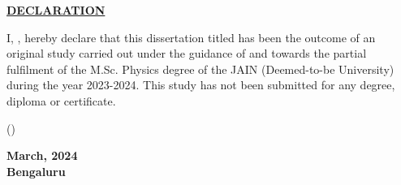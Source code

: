 \thispagestyle{empty}

\begin{center}
    \Large

    \underline{\textbf{DECLARATION}}\\

\end{center}

\vspace{1.5cm}

\noindent
I, \textbf{\auth{}}, hereby declare that this dissertation titled \textbf{\projectname} has been the outcome of an original study carried out under the guidance of \textbf{\gnameOne} and \textbf{\gnameTwo} towards
the partial fulfilment of the M.Sc. Physics degree of the JAIN (Deemed-to-be University)
during the year 2023-2024. This study has not been submitted for any degree, diploma or
certificate.

\vspace{5cm}

\noindent
\begin{minipage}{0.5\textwidth}
    \flushleft
    (\auth)

\end{minipage}%
\begin{minipage}{0.5\textwidth}
    \flushright

    \textbf{March, 2024\\
      Bengaluru}
\end{minipage}

